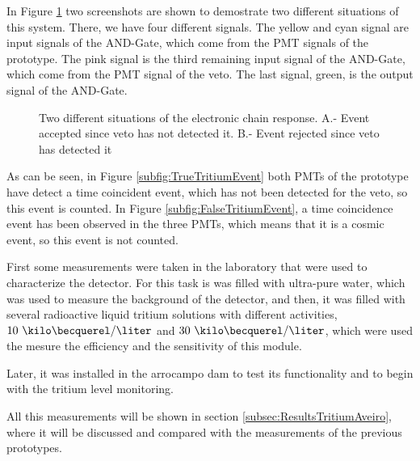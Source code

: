 In Figure \ref{fig:ScreenshotElectronic} two screenshots are shown to demostrate two different situations of this system. There, we have four different signals. The yellow and cyan signal are input signals of the AND-Gate, which come from the PMT signals of the prototype. The pink signal is the third remaining input signal of the AND-Gate, which come from the PMT signal of the veto. The last signal, green, is the output signal of the AND-Gate.

\begin{figure}[h]
 \centering
 \caption{Two different situations of the electronic chain response. A.- Event accepted since veto has not detected it. B.- Event rejected since veto has detected it}
 \label{fig:ScreenshotElectronic}
\end{figure}

As can be seen, in Figure \ref{subfig:TrueTritiumEvent} both PMTs of the prototype have detect a time coincident event, which has not been detected for the veto, so this event is counted. In Figure \ref{subfig:FalseTritiumEvent}, a time coincidence event has been observed in the three PMTs, which means that it is a cosmic event, so this event is not counted.

First some measurements were taken in the laboratory that were used to characterize the detector. For this task is was filled with ultra-pure water, which was used to measure the background of the detector, and then, it was filled with several radioactive liquid tritium solutions with different activities, $10~\kilo\becquerel/\liter$ and $30~\kilo\becquerel/\liter$, which were used the mesure the efficiency and the sensitivity of this module.

Later, it was installed in the arrocampo dam to test its functionality and to begin with the tritium level monitoring.

All this measurements will be shown in section \ref{subsec:ResultsTritiumAveiro}, where it will be discussed and compared with the measurements of the previous prototypes.

